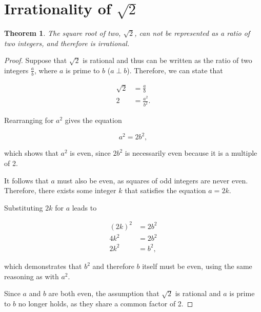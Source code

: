 \documentclass[parskip]{scrartcl}
\newtheorem{theorem}{Theorem}
\begin{document}
\section{Irrationality of \(\sqrt{2}\)}

\begin{theorem}
  The square root of two, \(\sqrt{2}\), can not be represented as a ratio of two
  integers, and therefore is irrational.
\end{theorem}

\begin{proof}
  Suppose that \(\sqrt{2}\) is rational and thus can be written as the ratio of
  two integers \(\frac{a}{b}\), where \(a\) is prime to \(b\) (\(a ⟂
  b\)). Therefore, we can state that

  \begin{align*}
    \sqrt{2} &= \frac{a}{b} \\
    2 &= \frac{a^2}{b^2}.
  \end{align*}

  Rearranging for \(a^2\) gives the equation

  \begin{equation*}
    a^2 = 2b^2,
  \end{equation*}

  which shows that \(a^2\) is even, since \(2b^2\) is necessarily even because
  it is a multiple of 2.

  It follows that \(a\) must also be even, as squares of odd integers are never
  even. Therefore, there exists some integer \(k\) that satisfies the equation
  \(a = 2k\).

  Substituting \(2k\) for \(a\) leads to

  \begin{align*}
    {(2k)}^2 &= 2b^2 \\
    4k^2 &= 2b^2 \\
    2k^2 &= b^2,
  \end{align*}

  which demonstrates that \(b^2\) and therefore \(b\) itself must be even, using
  the same reasoning as with \(a^2\).

  Since \(a\) and \(b\) are both even, the assumption that \(\sqrt{2}\) is
  rational and \(a\) is prime to \(b\) no longer holds, as they share a common
  factor of 2.
\end{proof}
\end{document}
